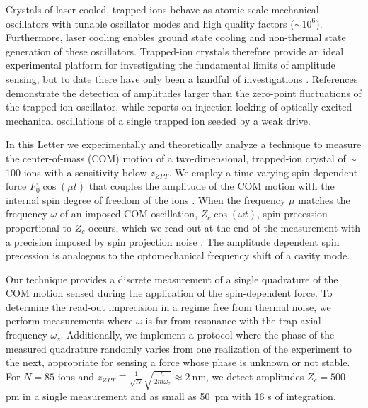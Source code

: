 \documentclass[aps,prl,twocolumn,superscriptaddress,floatfix]{revtex4-1}
\begin{document}
Crystals of laser-cooled, trapped ions behave as atomic-scale mechanical oscillators \citep{Jost2009,Biercuk2010,Sawyer2012} with tunable oscillator modes and high quality factors ($ {\sim} 10^6$). Furthermore, laser cooling enables ground state cooling and non-thermal state generation of these oscillators. Trapped-ion crystals therefore provide an ideal experimental platform for investigating the fundamental limits of amplitude sensing, but to date there have only been a handful of investigations \citep{Biercuk2010,Sawyer2012,Shaniv2016,Knunz2010}. References \citep{Biercuk2010,Sawyer2012,Shaniv2016} demonstrate the detection of amplitudes larger than the zero-point fluctuations of the trapped ion oscillator, while \citep{Knunz2010} reports on injection locking of optically excited mechanical oscillations of a single trapped ion seeded by a weak drive.

In this Letter we experimentally and theoretically analyze a technique to measure the center-of-mass (COM) motion of a two-dimensional, trapped-ion crystal of $\sim$100 ions with a sensitivity below $z_{ZPT}$. We employ a time-varying spin-dependent force $F_0\cos\left(\mu t\right)$ that couples the amplitude of the COM motion with the internal spin degree of freedom of the ions \citep{Sawyer2014,Ivanov2016}. When the frequency $\mu$ matches the frequency $\omega$ of an imposed COM oscillation, $Z_{c}\cos\left(\omega t\right)$, spin precession proportional to $Z_{c}$ occurs, which we read out at the end of the measurement with a precision imposed by spin projection noise \citep{Itano1993}. The amplitude dependent spin precession is analogous to the optomechanical frequency shift of a cavity mode.

Our technique provides a discrete measurement of a single quadrature of the COM motion sensed during the application of the spin-dependent force. To determine the read-out imprecision in a regime free from thermal noise, we perform measurements where $\omega$ is far from resonance with the trap axial frequency $\omega_z$. Additionally, we implement a protocol where the phase of the measured quadrature randomly varies from one realization of the experiment to the next, appropriate for sensing a force whose phase is unknown or not stable. For $N = 85$ ions and $z_{ZPT} \equiv \frac{1}{\sqrt{N}}\sqrt{\frac{\hbar}{2m\omega_z}} \approx 2\:\mathrm{nm}$, we detect amplitudes $Z_c = 500$ pm in a single measurement and as small as 50~pm with 16 s of integration.
\end{document}
